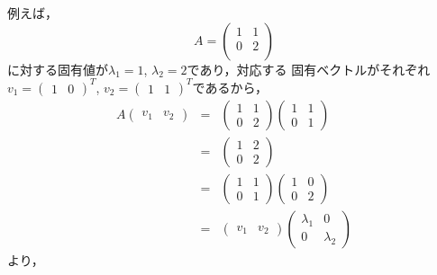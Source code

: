 例えば，
\[
 A = \left(
      \begin{array}{cc}
       1 & 1 \\
       0 & 2 \\
      \end{array}
     \right)
\]
に対する固有値が$\lambda_1 = 1$, $\lambda_2 = 2$であり，対応する
固有ベクトルがそれぞれ$v_1 = (\begin{array}{cc}1 & 0\end{array})^T$, 
$v_2 = (\begin{array}{cc}1 & 1\end{array})^T$であるから，
\begin{eqnarray}
 A
 \left(
 \begin{array}{cc}
  v_1 & v_2 
 \end{array}
 \right) 
 &= &
 \left(
 \begin{array}{cc}
  1 & 1 \\
  0 & 2
 \end{array}
 \right)
 \left(
 \begin{array}{cc}
  1 & 1 \\
  0 & 1
 \end{array}
 \right) \\
 &=&
 \left(
 \begin{array}{cc}
  1 & 2 \\
  0 & 2
 \end{array}
 \right) \nonumber \\
 &=&
 \left(
 \begin{array}{cc}
  1 & 1 \\
  0 & 1
 \end{array}
 \right)
 \left(
 \begin{array}{cc}
  1 & 0 \\
  0 & 2
 \end{array}
 \right) \nonumber \\
 &=&
 \left(
 \begin{array}{cc}
  v_1 & v_2 
 \end{array}
 \right) 
 \left(
 \begin{array}{cc}
  \lambda_1 & 0 \\
  0 & \lambda_2
 \end{array}
 \right)
\end{eqnarray}
より，
